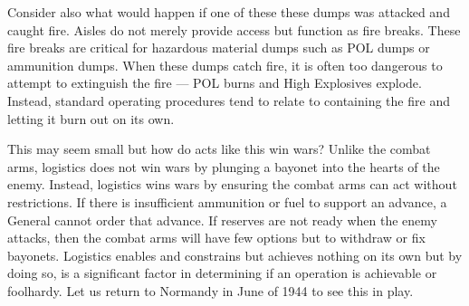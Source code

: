 \documentclass[noraggedright]{turabian-researchpaper}
\begin{document}
Consider also what would happen if one of these these dumps was attacked and
caught fire.  Aisles do not merely provide access but function as fire breaks.
These fire breaks are critical for hazardous material dumps such as POL dumps
or ammunition dumps.  When these dumps catch fire, it is often too dangerous
to attempt to extinguish the fire --- POL burns and High Explosives explode.
Instead, standard operating procedures tend to relate to containing the fire
and letting it burn out on its own.  %

This may seem small but how do acts like this win wars?  Unlike the combat 
arms, logistics does not win wars by plunging a bayonet into the hearts of the
enemy.   
Instead, logistics wins wars by ensuring the combat arms can act without 
restrictions.  If there is insufficient ammunition or fuel to support an 
advance, a General cannot order that advance.  If reserves are not ready when
the enemy attacks, then the combat arms will have few options but to withdraw
or fix bayonets.  
Logistics enables and constrains but achieves nothing on its own but by doing
so, is a significant factor in determining if an operation is achievable or
foolhardy.  Let us return to Normandy in June of 1944 to see this in play.





	



\end{document}
